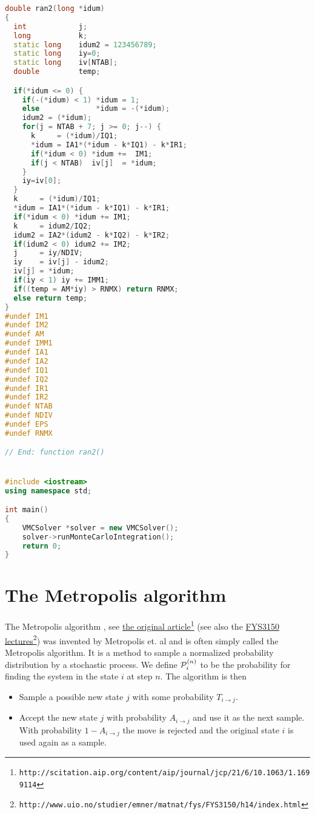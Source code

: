 \documentclass[graybox,sectrefs,envcountresetchap,open=right]{svmonodo}
\begin{document}
\begin{lstlisting}[language=C++,style=blue1]
double ran2(long *idum)
{
  int            j;
  long           k;
  static long    idum2 = 123456789;
  static long    iy=0;
  static long    iv[NTAB];
  double         temp;

  if(*idum <= 0) {
    if(-(*idum) < 1) *idum = 1;
    else             *idum = -(*idum);
    idum2 = (*idum);
    for(j = NTAB + 7; j >= 0; j--) {
      k     = (*idum)/IQ1;
      *idum = IA1*(*idum - k*IQ1) - k*IR1;
      if(*idum < 0) *idum +=  IM1;
      if(j < NTAB)  iv[j]  = *idum;
    }
    iy=iv[0];
  }
  k     = (*idum)/IQ1;
  *idum = IA1*(*idum - k*IQ1) - k*IR1;
  if(*idum < 0) *idum += IM1;
  k     = idum2/IQ2;
  idum2 = IA2*(idum2 - k*IQ2) - k*IR2;
  if(idum2 < 0) idum2 += IM2;
  j     = iy/NDIV;
  iy    = iv[j] - idum2;
  iv[j] = *idum;
  if(iy < 1) iy += IMM1;
  if((temp = AM*iy) > RNMX) return RNMX;
  else return temp;
}
#undef IM1
#undef IM2
#undef AM
#undef IMM1
#undef IA1
#undef IA2
#undef IQ1
#undef IQ2
#undef IR1
#undef IR2
#undef NTAB
#undef NDIV
#undef EPS
#undef RNMX

// End: function ran2()


#include <iostream>
using namespace std;

int main()
{
    VMCSolver *solver = new VMCSolver();
    solver->runMonteCarloIntegration();
    return 0;
}
\end{lstlisting}




\section{The Metropolis algorithm}

The Metropolis algorithm , see \href{{http://scitation.aip.org/content/aip/journal/jcp/21/6/10.1063/1.1699114}}{the original article}\footnote{\texttt{http://scitation.aip.org/content/aip/journal/jcp/21/6/10.1063/1.1699114}}  (see also the \href{{http://www.uio.no/studier/emner/matnat/fys/FYS3150/h14/index.html}}{FYS3150 lectures}\footnote{\texttt{http://www.uio.no/studier/emner/matnat/fys/FYS3150/h14/index.html}})
was invented by Metropolis et. al
and is often simply called the Metropolis algorithm.
It is a method to sample a normalized probability
distribution by a stochastic process. We define ${\cal P}_i^{(n)}$ to
be the probability for finding the system in the state $i$ at step $n$.
The algorithm is then

\begin{itemize}
\item Sample a possible new state $j$ with some probability $T_{i\rightarrow j}$.

\item Accept the new state $j$ with probability $A_{i \rightarrow j}$ and use it as the next sample. With probability $1-A_{i\rightarrow j}$ the move is rejected and the original state $i$ is used again as a sample.
\end{itemize}
\end{document}
